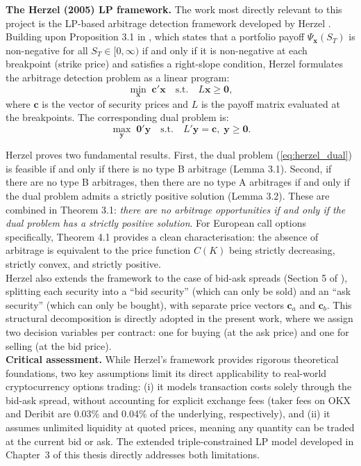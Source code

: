 \documentclass[openany]{book}
\numberwithin{figure}{chapter}
\numberwithin{equation}{chapter}
\begin{document}
\textbf{The Herzel (2005) LP framework.} The work most directly relevant to this project is the LP-based arbitrage detection framework developed by Herzel \cite{herzel2005}. Building upon Proposition 3.1 in \cite{herzel2005}, which states that a portfolio payoff $\Psi_{\mathbf{x}}(S_T)$ is non-negative for all $S_T \in [0, \infty)$ if and only if it is non-negative at each breakpoint (strike price) and satisfies a right-slope condition, Herzel formulates the arbitrage detection problem as a linear program:
\begin{equation}
\min_{\mathbf{x}} \; \mathbf{c}'\mathbf{x} \quad \text{s.t.} \quad L\mathbf{x} \geq \mathbf{0},
\label{eq:herzel_primal}
\end{equation}
where $\mathbf{c}$ is the vector of security prices and $L$ is the payoff matrix evaluated at the breakpoints. The corresponding dual problem is:
\begin{equation}
\max_{\mathbf{y}} \; \mathbf{0}'\mathbf{y} \quad \text{s.t.} \quad L'\mathbf{y} = \mathbf{c}, \; \mathbf{y} \geq \mathbf{0}.
\label{eq:herzel_dual}
\end{equation}

Herzel proves two fundamental results. First, the dual problem (\ref{eq:herzel_dual}) is feasible if and only if there is no type B arbitrage (Lemma 3.1). Second, if there are no type B arbitrages, then there are no type A arbitrages if and only if the dual problem admits a strictly positive solution (Lemma 3.2). These are combined in Theorem 3.1: \textit{there are no arbitrage opportunities if and only if the dual problem has a strictly positive solution}. For European call options specifically, Theorem 4.1 provides a clean characterisation: the absence of arbitrage is equivalent to the price function $C(K)$ being strictly decreasing, strictly convex, and strictly positive.\\

Herzel also extends the framework to the case of bid-ask spreads (Section 5 of \cite{herzel2005}), splitting each security into a ``bid security'' (which can only be sold) and an ``ask security'' (which can only be bought), with separate price vectors $\mathbf{c}_a$ and $\mathbf{c}_b$. This structural decomposition is directly adopted in the present work, where we assign two decision variables per contract: one for buying (at the ask price) and one for selling (at the bid price).\\

\textbf{Critical assessment.} While Herzel's framework provides rigorous theoretical foundations, two key assumptions limit its direct applicability to real-world cryptocurrency options trading: (i) it models transaction costs solely through the bid-ask spread, without accounting for explicit exchange fees (taker fees on OKX and Deribit are 0.03\% and 0.04\% of the underlying, respectively), and (ii) it assumes unlimited liquidity at quoted prices, meaning any quantity can be traded at the current bid or ask. The extended triple-constrained LP model developed in Chapter~3 of this thesis directly addresses both limitations.
\end{document}
